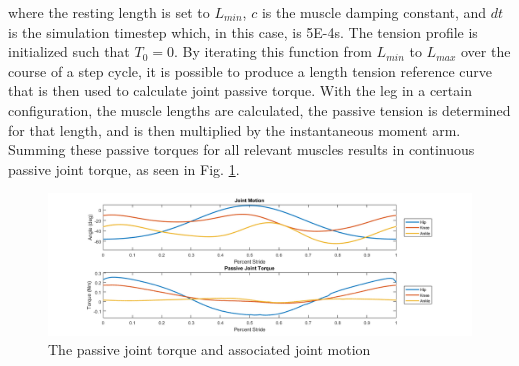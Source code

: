 \documentclass[runningheads,a4paper]{llncs}
\begin{document}
	where the resting length is set to $L_{min}$, $c$ is the muscle damping constant, and $dt$ is the simulation timestep which, in this case, is 5E-4s. The tension profile is initialized such that $T_{0} = 0$. By iterating this function from $L_{min}$ to $L_{max}$ over the course of a step cycle, it is possible to produce a length tension reference curve that is then used to calculate joint passive torque. With the leg in a certain configuration, the muscle lengths are calculated, the passive tension is determined for that length, and is then multiplied by the instantaneous moment arm. Summing these passive torques for all relevant muscles results in continuous passive joint torque, as seen in Fig. \ref{fig:pass1}.
		\begin{figure}
			\centering
			\includegraphics[width=.8\textwidth]{pass1.png}
			\caption{The passive joint torque and associated joint motion}
			\label{fig:pass1}
		\end{figure}
\end{document}
